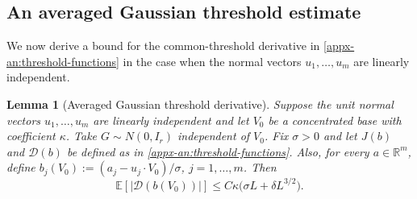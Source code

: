 \documentclass[11pt,letterpaper,twoside,leqno]{article}
\theoremstyle{bookplain}
\newtheorem{lemma}{Lemma}
\theoremstyle{bookremark}
\newcommand{\E}{\mathbb E}
\newcommand{\R}{\mathbb R}
\begin{document}
\subsection{An averaged Gaussian threshold estimate}
\label{appx-an:sec:threshold}
\begingroup
We now derive a bound for the common-threshold derivative in
\eqref{appx-an:threshold-functions} in the case when the normal vectors $u_1,\dots, u_m$ are linearly independent.

\begin{lemma}[Averaged Gaussian threshold derivative]
\label{appx-an:lem:threshold}
Suppose the unit normal vectors $u_1,\dots, u_m$ are linearly independent and let \(V_0\) be a
concentrated base{ with coefficient \(\kappa\)}. Take \(G\sim N(0,I_r)\) independent of \(V_0\). Fix \(\sigma>0\) and let $J(b)$ and $\mathcal D(b)$ be defined as in \eqref{appx-an:threshold-functions}.
Also, for every \(a\in\R^m\), {define}
\(b_j(V_0):=(a_j-u_j\cdot V_0)/\sigma\), $j=1,\dots, m$. Then
\begin{equation}
 \E[|\mathcal D(b(V_0))|]
{\le C\kappa\bigl(\sigma L+\delta L^{3/2}\bigr).}
 \label{appx-an:threshold-bound}
\end{equation}
\end{lemma}
\end{document}
